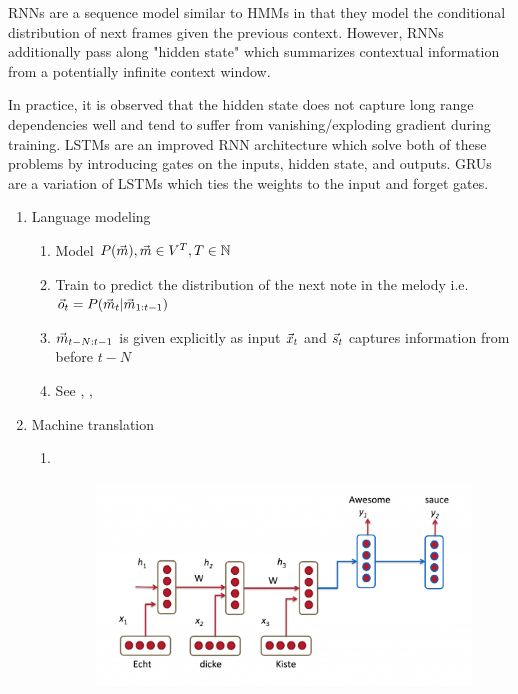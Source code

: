 RNNs are a sequence model similar to HMMs in that they model the conditional
distribution of next frames given the previous context. However, RNNs additionally
pass along "hidden state" which summarizes contextual information from a potentially
infinite context window.

In practice, it is observed that the hidden state does not capture long range
dependencies well and tend to suffer from vanishing/exploding gradient during
training. LSTMs are an improved RNN architecture which solve both of these
problems by introducing gates on the inputs, hidden state, and outputs. GRUs are
a variation of LSTMs which ties the weights to the input and forget gates.

\begin{enumerate}
    \item Language modeling
        \begin{enumerate}
            \item Model $P(\vec{m}), \vec{m} \in V^T, T \in \mathbb{N}$
            \item Train to predict the distribution of the next note in the
                melody i.e.\ $\vec{o}_t = P(\vec{m}_t | \vec{m}_{1:t-1})$
            \item $\vec{m}_{t-N:t-1}$ is given explicitly as input $\vec{x}_t$ and
                $\vec{s}_{t}$ captures information from before $t-N$
            \item See \cite{Martens2011}, \cite{Mikolov2011}, \cite{Mikolov2010}
        \end{enumerate}
    \item Machine translation
        \begin{enumerate}
            \item~\\
                \begin{figure}[htpb]
                    \centering
                    \includegraphics[width=0.8\linewidth]{Figures/rnn-mt.png}
                    \caption{}

\end{figure}
\end{enumerate}
\end{enumerate}

